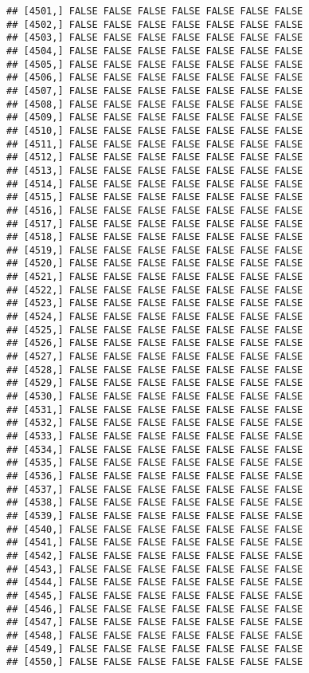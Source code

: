 \documentclass[
]{article}
\begin{document}
\begin{verbatim}
## [4501,] FALSE FALSE FALSE FALSE FALSE FALSE FALSE
## [4502,] FALSE FALSE FALSE FALSE FALSE FALSE FALSE
## [4503,] FALSE FALSE FALSE FALSE FALSE FALSE FALSE
## [4504,] FALSE FALSE FALSE FALSE FALSE FALSE FALSE
## [4505,] FALSE FALSE FALSE FALSE FALSE FALSE FALSE
## [4506,] FALSE FALSE FALSE FALSE FALSE FALSE FALSE
## [4507,] FALSE FALSE FALSE FALSE FALSE FALSE FALSE
## [4508,] FALSE FALSE FALSE FALSE FALSE FALSE FALSE
## [4509,] FALSE FALSE FALSE FALSE FALSE FALSE FALSE
## [4510,] FALSE FALSE FALSE FALSE FALSE FALSE FALSE
## [4511,] FALSE FALSE FALSE FALSE FALSE FALSE FALSE
## [4512,] FALSE FALSE FALSE FALSE FALSE FALSE FALSE
## [4513,] FALSE FALSE FALSE FALSE FALSE FALSE FALSE
## [4514,] FALSE FALSE FALSE FALSE FALSE FALSE FALSE
## [4515,] FALSE FALSE FALSE FALSE FALSE FALSE FALSE
## [4516,] FALSE FALSE FALSE FALSE FALSE FALSE FALSE
## [4517,] FALSE FALSE FALSE FALSE FALSE FALSE FALSE
## [4518,] FALSE FALSE FALSE FALSE FALSE FALSE FALSE
## [4519,] FALSE FALSE FALSE FALSE FALSE FALSE FALSE
## [4520,] FALSE FALSE FALSE FALSE FALSE FALSE FALSE
## [4521,] FALSE FALSE FALSE FALSE FALSE FALSE FALSE
## [4522,] FALSE FALSE FALSE FALSE FALSE FALSE FALSE
## [4523,] FALSE FALSE FALSE FALSE FALSE FALSE FALSE
## [4524,] FALSE FALSE FALSE FALSE FALSE FALSE FALSE
## [4525,] FALSE FALSE FALSE FALSE FALSE FALSE FALSE
## [4526,] FALSE FALSE FALSE FALSE FALSE FALSE FALSE
## [4527,] FALSE FALSE FALSE FALSE FALSE FALSE FALSE
## [4528,] FALSE FALSE FALSE FALSE FALSE FALSE FALSE
## [4529,] FALSE FALSE FALSE FALSE FALSE FALSE FALSE
## [4530,] FALSE FALSE FALSE FALSE FALSE FALSE FALSE
## [4531,] FALSE FALSE FALSE FALSE FALSE FALSE FALSE
## [4532,] FALSE FALSE FALSE FALSE FALSE FALSE FALSE
## [4533,] FALSE FALSE FALSE FALSE FALSE FALSE FALSE
## [4534,] FALSE FALSE FALSE FALSE FALSE FALSE FALSE
## [4535,] FALSE FALSE FALSE FALSE FALSE FALSE FALSE
## [4536,] FALSE FALSE FALSE FALSE FALSE FALSE FALSE
## [4537,] FALSE FALSE FALSE FALSE FALSE FALSE FALSE
## [4538,] FALSE FALSE FALSE FALSE FALSE FALSE FALSE
## [4539,] FALSE FALSE FALSE FALSE FALSE FALSE FALSE
## [4540,] FALSE FALSE FALSE FALSE FALSE FALSE FALSE
## [4541,] FALSE FALSE FALSE FALSE FALSE FALSE FALSE
## [4542,] FALSE FALSE FALSE FALSE FALSE FALSE FALSE
## [4543,] FALSE FALSE FALSE FALSE FALSE FALSE FALSE
## [4544,] FALSE FALSE FALSE FALSE FALSE FALSE FALSE
## [4545,] FALSE FALSE FALSE FALSE FALSE FALSE FALSE
## [4546,] FALSE FALSE FALSE FALSE FALSE FALSE FALSE
## [4547,] FALSE FALSE FALSE FALSE FALSE FALSE FALSE
## [4548,] FALSE FALSE FALSE FALSE FALSE FALSE FALSE
## [4549,] FALSE FALSE FALSE FALSE FALSE FALSE FALSE
## [4550,] FALSE FALSE FALSE FALSE FALSE FALSE FALSE

\end{verbatim}
\end{document}
